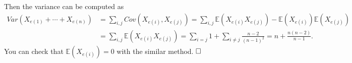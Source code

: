 \documentclass[12pt]{article}
\begin{document}
Then the variance can be computed as
\begin{equation*}
\begin{aligned}
Var(X_{e(1)}+\cdots+X_{e(n)}) &= \sum_{i,j}Cov(X_{e(i)}, X_{e(j)})=\sum_{i,j}\mathbb{E}(X_{e(i)}X_{e(j)})-\mathbb{E}(X_{e(i)})\mathbb{E}(X_{e(j)}) \\&
=\sum_{i,j}\mathbb{E}(X_{e(i)}X_{e(j)})
=\sum_{i=j}1+\sum_{i\neq j}\frac{n-2}{(n-1)^2}=n+\frac{n(n-2)}{n-1}.
\end{aligned}
\end{equation*}
You can check that $\mathbb{E}(X_{e(i)})=0$ with the similar method.
$\hspace{\fill}\square$
\end{document}
